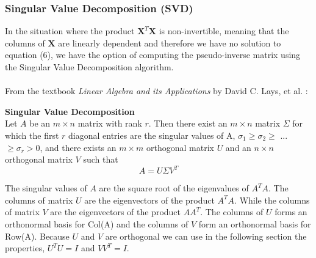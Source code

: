\documentclass[a4paper,twocolumn]{article}
\newcommand{\X}{\mathbf{X}}
\begin{document}
\subsubsection{Singular Value Decomposition (SVD)}
In the situation where the product $\X^{T}\X$ is non-invertible, meaning that the columns of $\X$ are linearly dependent and therefore we have no solution to equation (6), we have the option of computing the pseudo-inverse matrix using the Singular Value Decomposition algorithm.\\
\\
From the textbook \textit{Linear Algebra and its Applications} by David C. Lays, et al. \cite{linalg}:
\begin{tcolorbox}[colback=blue!8]
\textbf{Singular Value Decomposition}\\
Let $A$ be an $m \times n$ matrix with rank $r$. Then there exist an $m \times n$ matrix $\Sigma$ for which the first $r$ diagonal entries are the singular values of A, $\sigma_{1} \geq \sigma_{2} \geq$ ... $\geq \sigma_{r} > 0$, and there exists an $m \times m$ orthogonal matrix $U$ and an $n\times n$ orthogonal matrix $V$ such that 
$$
A = U\Sigma V^{T}
$$
\end{tcolorbox}
\noindent The singular values of $A$ are the square root of the eigenvalues of $A^{T}A$. The columns of matrix $U$ are the eigenvectors of the product $A^{T}A$. While the columns of matrix $V$ are the eigenvectors of the product $AA^{T}$. The columns of $U$ forms an orthonormal basis for Col(A) and the columns of $V$ form an orthonormal basis for Row(A). Because $U$ and $V$ are orthogonal we can use in the following section the properties, $U^{T}U=I$ and $VV^{T}=I$.
\end{document}

